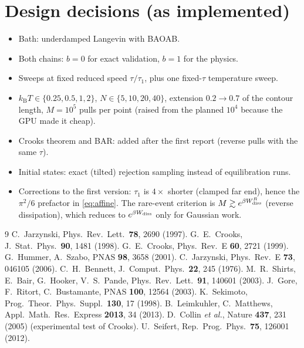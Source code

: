 \documentclass[11pt,a4paper]{article}
\newcommand{\kT}{k_{\mathrm B}T}
\newcommand{\Wd}{W_{\rm diss}}
\begin{document}
\section{Design decisions (as implemented)}
\label{sec:decisions}
\begin{itemize}[leftmargin=*]
\item Bath: underdamped Langevin with BAOAB.
\item Both chains: $b=0$ for exact validation, $b=1$ for the physics.
\item Sweeps at fixed reduced speed $\tau/\tau_1$, plus one fixed-$\tau$ temperature sweep.
\item $\kT\in\{0.25,0.5,1,2\}$, $N\in\{5,10,20,40\}$, extension $0.2\to0.7$ of the contour length,
$M=10^5$ pulls per point (raised from the planned $10^4$ because the GPU made it cheap).
\item Crooks theorem and BAR: added after the first report (reverse pulls with the same $\tau$).
\item Initial states: exact (tilted) rejection sampling instead of equilibration runs.
\item Corrections to the first version: $\tau_1$ is $4\times$ shorter (clamped far end), hence the
$\pi^2/6$ prefactor in \eqref{eq:affine}. The rare-event criterion is
$M\gtrsim e^{\beta\Wd^R}$ (reverse dissipation), which reduces to $e^{\beta\Wd}$ only for Gaussian work.
\end{itemize}

\begin{thebibliography}{9}
 C.~Jarzynski, Phys.\ Rev.\ Lett.\ \textbf{78}, 2690 (1997).
 G.~E.~Crooks, J.\ Stat.\ Phys.\ \textbf{90}, 1481 (1998).
 G.~E.~Crooks, Phys.\ Rev.\ E \textbf{60}, 2721 (1999).
 G.~Hummer, A.~Szabo, PNAS \textbf{98}, 3658 (2001).
 C.~Jarzynski, Phys.\ Rev.\ E \textbf{73}, 046105 (2006).
 C.~H.~Bennett, J.\ Comput.\ Phys.\ \textbf{22}, 245 (1976).
 M.~R.~Shirts, E.~Bair, G.~Hooker, V.~S.~Pande, Phys.\ Rev.\ Lett.\ \textbf{91}, 140601 (2003).
 J.~Gore, F.~Ritort, C.~Bustamante, PNAS \textbf{100}, 12564 (2003).
 K.~Sekimoto, Prog.\ Theor.\ Phys.\ Suppl.\ \textbf{130}, 17 (1998).
 B.~Leimkuhler, C.~Matthews, Appl.\ Math.\ Res.\ Express \textbf{2013}, 34 (2013).
 D.~Collin \emph{et al.}, Nature \textbf{437}, 231 (2005) (experimental test of Crooks).
 U.~Seifert, Rep.\ Prog.\ Phys.\ \textbf{75}, 126001 (2012).
\end{thebibliography}
\end{document}
